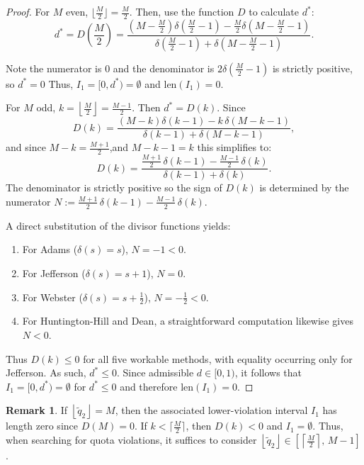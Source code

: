 \documentclass[11pt]{article}
\theoremstyle{definition}
\newtheorem{remark}[theorem]{Remark}
\theoremstyle{definition}
\begin{document}
\begin{proof} For $M$ even, $\lfloor \frac{M}{2} \rfloor = \frac{M}{2}$. Then, use the function $D$ to calculate $d^*$:
$$ d^* = D \left( \frac{M}{2} \right) =\frac{\left(M-\frac{M}{2}\right) \delta \left(\frac{M}{2}-1\right) - \frac{M}{2} \delta \left(M-\frac{M}{2}-1 \right)}{\delta \left(\frac{M}{2}-1\right)+\delta\left(M-\frac{M}{2}-1 \right)}.$$

Note the numerator is 0 and the denominator is $2\delta(\frac M2 -1)$ is strictly positive, so $d^* = 0$
Thus, $I_1 =[0,d^*) = \emptyset$ and $\text{len} (I_1) = 0$. 

For $M$ odd, $k =\left\lfloor \frac{M}{2} \right\rfloor=\frac{M-1}{2}$. Then $d^* = D(k).$
Since $$D(k) = \frac{(M-k)\delta(k-1)-k\,\delta(M-k-1)}{\delta(k-1)+\delta(M-k-1)},$$
and since $M-k=\frac{M+1}{2}$,and $M-k-1=k$ this simplifies to:
$$D(k) = \frac{\frac{M+1}{2}\, \delta(k-1)-\frac{M-1}{2}\, \delta(k)}{\delta(k-1)+\delta(k)}.$$
The denominator is strictly positive so the sign of $D(k)$ is determined by the numerator
$N := \frac{M+1}{2}\, \delta(k-1) - \frac{M-1}{2}\, \delta(k).$

A direct substitution of the divisor functions yields:
\begin{enumerate}
\item For Adams ($\delta(s)=s$), $N=-1<0$.
\item For Jefferson ($\delta(s)=s+1$), $N=0$.
\item For Webster ($\delta(s)=s+\tfrac12$), $N=-\tfrac12<0$.
\item For Huntington-Hill and Dean, a straightforward computation likewise gives $N<0$.
\end{enumerate}

Thus $D(k)\le 0$ for all five workable methods, with equality occurring only for Jefferson. As such, $d^*\le 0$. Since admissible $d\in[0,1)$, it follows that $
I_1=[0,d^*)= \emptyset$ for $d^*\leq 0$ and therefore $\mathrm{len}(I_1)=0$.
\end{proof}

\begin{remark}\label{d.M/2}
If $\left\lfloor \tilde{q}_2 \right\rfloor = M$, then the associated lower-violation interval $I_1$ has length zero since $D(M) = 0$. If $k < \lceil \frac{M}{2} \rceil$, then $D(k) <0$ and $I_1 = \emptyset.$ Thus, when searching for quota violations, it suffices to consider $\left\lfloor \tilde q_2 \right\rfloor \in [\left \lceil \frac{M}{2} \right \rceil,\, M-1]$.
\end{remark}
\end{document}
